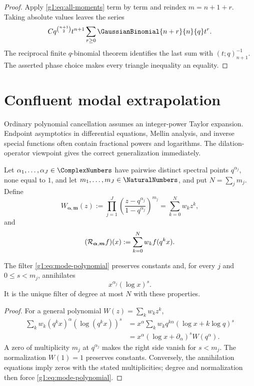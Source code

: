 \begin{proof}
Apply \eqref{g1:eq:all-moments} term by term and reindex $m=n+1+r$.
Taking absolute values leaves the series
\[
 Cq^{\binom{n+1}{2}}t^{n+1}
 \sum_{r\ge0}\GaussianBinomial{n+r}{n}{q}t^r.
\]
The reciprocal finite $q$-binomial theorem identifies the last sum with
$(t;q)_{n+1}^{-1}$.  The asserted phase choice makes every triangle
inequality an equality.
\end{proof}

\section{Confluent modal extrapolation}
\label{g1:sec:modal}

Ordinary polynomial cancellation assumes an integer-power Taylor expansion.
Endpoint asymptotics in differential equations, Mellin analysis, and inverse
special functions often contain fractional powers and logarithms.  The
dilation-operator viewpoint gives the correct generalization immediately.

\begin{definition}
Let $\alpha_1,\ldots,\alpha_J\in\ComplexNumbers$ have pairwise distinct spectral
points $q^{\alpha_j}$, none equal to $1$, and let $m_1,\ldots,m_J\in\NaturalNumbers$, and put $N=\sum_jm_j$.  Define
\begin{equation}
 W_{\bm\alpha,\bm m}(z)
 :=\prod_{j=1}^J
 \left(\frac{z-q^{\alpha_j}}{1-q^{\alpha_j}}\right)^{m_j}
 =\sum_{k=0}^Nw_kz^k,
 \label{g1:eq:mode-polynomial}
\end{equation}
and
\[
 (\mathcal R_{\bm\alpha,\bm m}f)(x):=\sum_{k=0}^Nw_kf(q^kx).
\]
\end{definition}

\begin{theorem}
The filter \eqref{g1:eq:mode-polynomial} preserves constants and, for every
$j$ and $0\le s<m_j$, annihilates
\[
 x^{\alpha_j}(\log x)^s.
\]
It is the unique filter of degree at most $N$ with these properties.
\end{theorem}

\begin{proof}
For a general polynomial $W(z)=\sum_kw_kz^k$,
\begin{align*}
 \sum_kw_k(q^kx)^\alpha(\log(q^kx))^s
 &=x^\alpha\sum_kw_kq^{k\alpha}
   (\log x+k\log q)^s\\
 &=x^\alpha(\log x+\partial_\alpha)^sW(q^\alpha).
\end{align*}
A zero of multiplicity $m_j$ at $q^{\alpha_j}$ makes the right side vanish for
$s<m_j$.  The normalization $W(1)=1$ preserves constants.  Conversely, the
annihilation equations imply zeros with the stated multiplicities; degree and
normalization then force \eqref{g1:eq:mode-polynomial}.
\end{proof}

